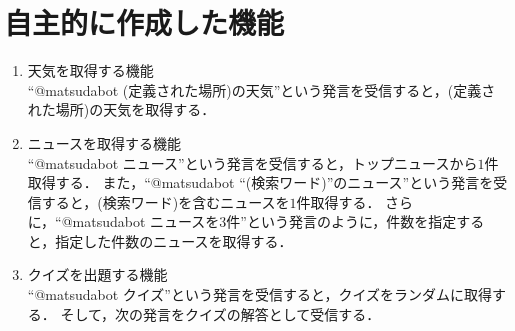 \documentclass[12pt]{jsarticle}
\begin{document}
\section{自主的に作成した機能}
\begin{enumerate}
\item 天気を取得する機能\\
``@matsudabot (定義された場所)の天気''という発言を受信すると，(定義された場所)の天気を取得する．
\item ニュースを取得する機能\\
``@matsudabot ニュース''という発言を受信すると，トップニュースから$1$件取得する．
また，``@matsudabot ``(検索ワード)''のニュース''という発言を受信すると，(検索ワード)を含むニュースを$1$件取得する．
さらに，``@matsudabot ニュースを3件''という発言のように，件数を指定すると，指定した件数のニュースを取得する．
\item クイズを出題する機能\\
``@matsudabot クイズ''という発言を受信すると，クイズをランダムに取得する．
そして，次の発言をクイズの解答として受信する．
\end{enumerate}



\end{document}
